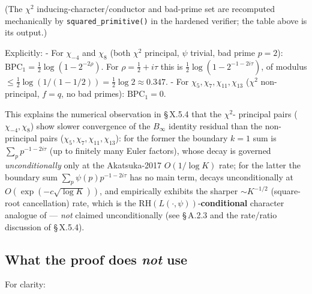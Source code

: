 (The \(\chi^2\) inducing-character/conductor and bad-prime set are
recomputed mechanically by \texttt{squared\_primitive()} in the hardened
verifier; the table above is its output.)

Explicitly:
- For \(\chi_{-4}\) and \(\chi_8\) (both \(\chi^2\) principal, \(\psi\)
trivial, bad prime \(p=2\)): \(\mathrm{BPC}_1 = \tfrac{1}{2}\log(1 -
  2^{-2\rho})\). For \(\rho = \tfrac12 + i\tau\) this is
\(\tfrac{1}{2}\log(1 - 2^{-1 - 2i\tau})\), of modulus
\(\le \tfrac{1}{2}\log(1/(1-1/2)) = \tfrac12 \log 2 \approx 0.347\).
- For \(\chi_5, \chi_7, \chi_{11}, \chi_{13}\) (\(\chi^2\) non-principal,
\(f = q\), no bad primes): \(\mathrm{BPC}_1 = 0\).

This explains the numerical observation in \S\,X.5.4 that the \(\chi^2\)-
principal pairs (\(\chi_{-4}, \chi_8\)) show slower convergence of the
\(B_\infty\) identity residual than the non-principal pairs (\(\chi_5,
\chi_7, \chi_{11}, \chi_{13}\)): for the former the boundary \(k=1\)
sum is \(\sum_p p^{-1-2i\tau}\) (up to finitely many Euler factors),
whose decay is governed \emph{unconditionally} only at the
Akatsuka-2017 \(O(1/\log K)\) rate; for the latter the boundary sum
\(\sum_p\psi(p)p^{-1-2i\tau}\) has no main term, decays
unconditionally at \(O(\exp(-c\sqrt{\log K}))\), and empirically
exhibits the sharper \(\sim K^{-1/2}\) (square-root cancellation)
rate, which is the RH\((L(\cdot,\psi))\)-\textbf{conditional} character
analogue of \cite{Soundararajan2009} --- \emph{not} claimed unconditionally
(see \S\,A.2.3 and the rate/ratio discussion of \S\,X.5.4).

\subsection{What the proof does \emph{not} use}

For clarity:

